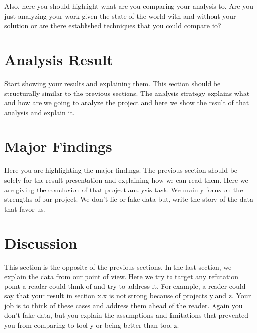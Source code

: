 Also, here you should highlight what are you comparing your analysis to. Are you just analyzing your work given the state of the world with and without your solution or are there established techniques that you could compare to?


\section{Analysis Result} %
\label{sec:analysis_result}

Start showing your results and explaining them. This section should be structurally similar to the previous sections. The analysis strategy explains what and how are we going to analyze the project and here we show the result of that analysis and explain it.


\section{Major Findings} %
\label{sec:major_findings}

Here you are highlighting the major findings. The previous section should be solely for the result presentation and explaining how we can read them. Here we are giving the conclusion of that project analysis task. We mainly focus on the strengths of our project. We don't lie or fake data but, write the story of the data that favor us.


\section{Discussion} %
\label{sec:discussion}

This section is the opposite of the previous sections. In the last section, we explain the data from our point of view. Here we try to target any refutation point a reader could think of and try to address it. For example, a reader could say that your result in section x.x is not strong because of projects y and z. Your job is to think of these cases and address them ahead of the reader. Again you don't fake data, but you explain the assumptions and limitations that prevented you from comparing to tool y or being better than tool z.

